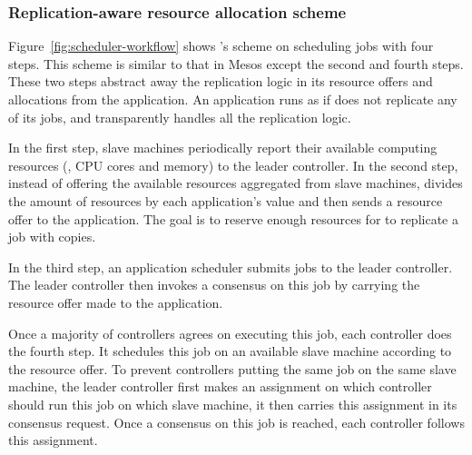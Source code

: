 \vspace{-.15in}\subsubsection{Replication-aware resource allocation scheme}
\label{sec:workflow}\vspace{-.075in}

Figure~\ref{fig:scheduler-workflow} shows \tripod's scheme on scheduling jobs 
with four steps. This scheme is similar to that in Mesos except the second 
and fourth steps. These two steps \tripod abstract away the replication logic 
in its resource offers and allocations from the application. An application runs 
as if \xxx does not replicate any of its jobs, and \tripod transparently 
handles all the replication logic.

In the first step, slave machines periodically report their available computing 
resources (\eg, CPU cores and memory) to the leader controller. In the second 
step, instead of offering the available resources aggregated from slave 
machines, \tripod divides the amount of resources by each application's  
value and then sends a resource offer to the application. The goal is to 
reserve enough resources for \tripod to replicate a job with  copies.

In the third step, an application scheduler submits jobs to the leader 
controller. The leader controller then invokes a consensus on this job by 
carrying the resource offer made to the application.

Once a majority of controllers agrees on executing this job, each controller 
does the fourth step. It schedules this job on an available slave machine 
according to the resource offer. To prevent controllers putting the same job on 
the same slave machine, the leader controller first makes an assignment on 
which controller should run this job on which slave machine, it then carries 
this assignment in its consensus request. Once a consensus on this job is 
reached, each controller follows this assignment.



